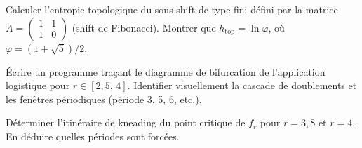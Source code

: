 \begin{exercice}[Entropie]
Calculer l'entropie topologique du sous-shift de type fini d\'efini par la
matrice $A = \begin{pmatrix} 1 & 1 \\ 1 & 0 \end{pmatrix}$ (shift de Fibonacci).
Montrer que $h_{\mathrm{top}} = \ln\varphi$, o\`u $\varphi = (1+\sqrt{5})/2$.
\end{exercice}

\begin{exercice}
\'Ecrire un programme tra\c{c}ant le diagramme de bifurcation de l'application
logistique pour $r \in [2{,}5, \, 4]$. Identifier visuellement la cascade de
doublements et les fen\^etres p\'eriodiques (p\'eriode 3, 5, 6, etc.).
\end{exercice}

\begin{exercice}
D\'eterminer l'itin\'eraire de kneading du point critique de $f_r$ pour
$r = 3{,}8$ et $r = 4$. En d\'eduire quelles p\'eriodes sont forc\'ees.
\end{exercice}

